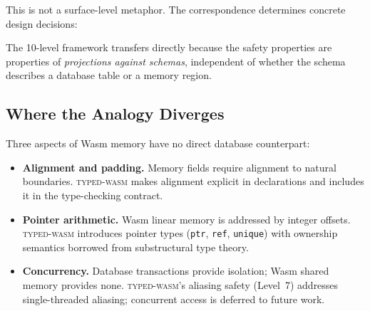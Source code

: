 \documentclass[11pt,a4paper]{article}
\newcommand{\typedwasm}{\textsc{typed-wasm}}
\begin{document}
This is not a surface-level metaphor.  The correspondence determines
concrete design decisions:


The 10-level framework transfers directly because the safety properties
are properties of \emph{projections against schemas}, independent of
whether the schema describes a database table or a memory region.

\subsection{Where the Analogy Diverges}
\label{sec:divergences}

Three aspects of Wasm memory have no direct database counterpart:

\begin{itemize}
  \item \textbf{Alignment and padding.}  Memory fields require alignment
    to natural boundaries.  \typedwasm{} makes alignment explicit in
    declarations and includes it in the type-checking contract.

  \item \textbf{Pointer arithmetic.}  Wasm linear memory is addressed by
    integer offsets.  \typedwasm{} introduces pointer types
    (\lstinline{ptr}, \lstinline{ref}, \lstinline{unique}) with ownership
    semantics borrowed from substructural type theory.

  \item \textbf{Concurrency.}  Database transactions provide isolation;
    Wasm shared memory provides none.  \typedwasm{}'s aliasing safety
    (Level~7) addresses single-threaded aliasing; concurrent access is
    deferred to future work.
\end{itemize}
\end{document}
